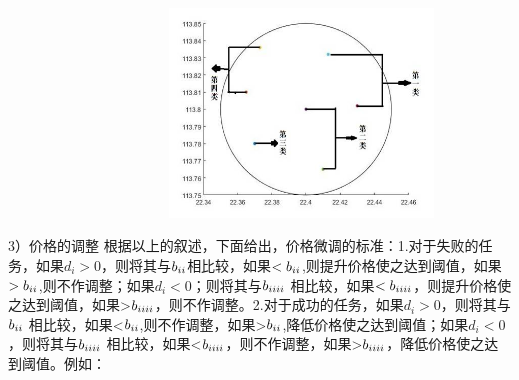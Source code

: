 \documentclass{ctexart}
\begin{document}
 \ \ \ \ \ \ \  \ \ \ \ \ \ \  \ \ \ \  \ \ \ \  \  \includegraphics[width=7cm]{9.jpg}

3）价格的调整
根据以上的叙述，下面给出，价格微调的标准：1.对于失败的任务，如果$d_{i}>0$，则将其与$b_{\uppercase\expandafter{\romannumeral1}i}$相比较，如果$<b_{\uppercase\expandafter{\romannumeral1}i}$,则提升价格使之达到阈值，如果$>b_{\uppercase\expandafter{\romannumeral1}i}$,则不作调整；如果$d_{i}<0$；则将其与$b_{\uppercase\expandafter{\romannumeral3}i}$ 相比较，如果$<b_{\uppercase\expandafter{\romannumeral3}i}$，则提升价格使之达到阈值，如果>$b_{\uppercase\expandafter{\romannumeral3}i}$，则不作调整。2.对于成功的任务，如果$d_{i}>0$，则将其与$b_{\uppercase\expandafter{\romannumeral1}i}$ 相比较，如果<$b_{\uppercase\expandafter{\romannumeral1}i}$,则不作调整，如果>$b_{\uppercase\expandafter{\romannumeral1}i}$,降低价格使之达到阈值；如果$d_{i}<0$，则将其与$b_{\uppercase\expandafter{\romannumeral3}i}$ 相比较，如果<$b_{\uppercase\expandafter{\romannumeral3}i}$，则不作调整，如果>$b_{\uppercase\expandafter{\romannumeral3}i}$，降低价格使之达到阈值。例如：
\end{document}
